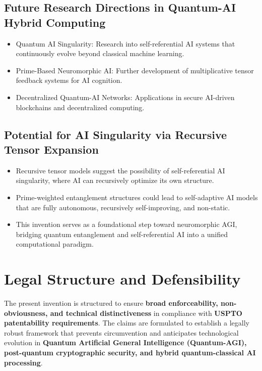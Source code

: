 \documentclass{article}
\theoremstyle{plain}
\begin{document}
\begin{itemize}
\subsection{Future Research Directions in Quantum-AI Hybrid Computing}
\begin{itemize}
    \item Quantum AI Singularity: Research into self-referential AI systems that continuously evolve beyond classical machine learning.
    \item Prime-Based Neuromorphic AI: Further development of multiplicative tensor feedback systems for AI cognition.
    \item Decentralized Quantum-AI Networks: Applications in secure AI-driven blockchains and decentralized computing.
\end{itemize}

\subsection{Potential for AI Singularity via Recursive Tensor Expansion}
\begin{itemize}
    \item Recursive tensor models suggest the possibility of self-referential AI singularity, where AI can recursively optimize its own structure.
    \item Prime-weighted entanglement structures could lead to self-adaptive AI models that are fully autonomous, recursively self-improving, and non-static.
    \item This invention serves as a foundational step toward neuromorphic AGI, bridging quantum entanglement and self-referential AI into a unified computational paradigm.
\end{itemize}

\section{Legal Structure and Defensibility}

The present invention is structured to ensure \textbf{broad enforceability, non-obviousness, and technical distinctiveness} in compliance with \textbf{USPTO patentability requirements}. The claims are formulated to establish a legally robust framework that prevents circumvention and anticipates technological evolution in \textbf{Quantum Artificial General Intelligence (Quantum-AGI), post-quantum cryptographic security, and hybrid quantum-classical AI processing}.


\end{itemize}
\end{document}
